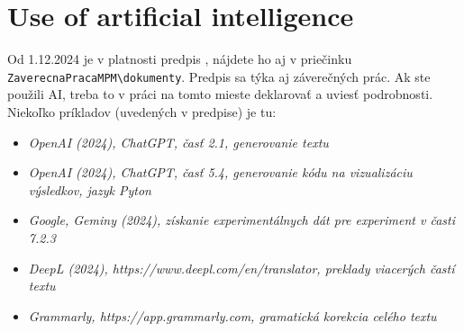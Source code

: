 \chapter*{Use of artificial intelligence}

Od 1.12.2024 je v platnosti predpis , nájdete ho aj v priečinku \verb|ZaverecnaPracaMPM\dokumenty|. Predpis sa týka aj záverečných prác. Ak ste použili AI, treba to v práci na tomto mieste deklarovať a uviesť podrobnosti. Niekoľko príkladov (uvedených v predpise) je tu:

\begin{itemize}
	\item \textit{OpenAI (2024), ChatGPT, časť 2.1, generovanie textu}
	
	\item \textit{OpenAI (2024), ChatGPT, časť 5.4, generovanie kódu na vizualizáciu výsledkov, jazyk Pyton}
	
	\item \textit{Google, Geminy (2024), získanie experimentálnych dát pre experiment v časti 7.2.3}
	
	\item \textit{DeepL (2024), https://www.deepl.com/en/translator, preklady viacerých častí textu}
	
	\item \textit{Grammarly, https://app.grammarly.com, gramatická korekcia celého textu}
\end{itemize}
	
